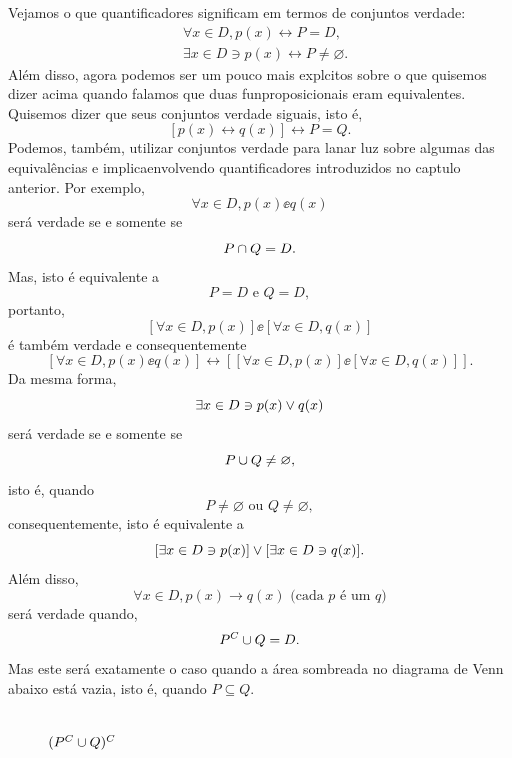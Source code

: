 Vejamos o que quantificadores significam em termos de conjuntos verdade:
\begin{equation*}
 \begin{aligned}
& \forall x \in D, p(x)\leftrightarrow P=D,\\
& \exists x \in D \ni p(x)\leftrightarrow P\neq\varnothing.
 \end{aligned}
\end{equation*}
Al\'em disso, agora podemos ser um pouco mais expl\ih citos sobre o que quisemos dizer acima quando falamos que duas fun\coes proposicionais eram equivalentes. Quisemos dizer que seus conjuntos verdade s\ao iguais, isto \'e,
\[
[p(x)\leftrightarrow q(x)]\leftrightarrow P=Q.
\]
Podemos, tamb\'em, utilizar conjuntos verdade para lan\cc ar luz sobre algumas das equival\^encias e implica\coes envolvendo quantificadores introduzidos no cap\ih tulo anterior. Por exemplo,
\[
\forall x\in D, p(x)\ee q(x)
\] 
ser\'a verdade se e somente se
\[
P\cap Q=D.
\]
Mas, isto \'e equivalente a
\[
P=D \textrm{ e } Q=D,
\]
portanto,
\[
[\forall x \in D, p(x)]\ee[\forall x \in D, q(x)]
\]
\'e tamb\'em verdade e consequentemente
\[
[\forall x\in D, p(x)\ee q(x)]\leftrightarrow[[\forall x \in D, p(x)]\ee[\forall x \in D, q(x)]].
\]
Da mesma forma,
\[
\exists x\in D\ni p(x)\vee q(x)
\]
ser\'a verdade se e somente se
\[
P\cup Q\neq\varnothing,
\]
isto \'e, quando
\[
P\neq\varnothing \textrm{ ou } Q\neq\varnothing,
\]
consequentemente, isto \'e equivalente a 
\[
[\exists x\in D\ni p(x)]\vee[\exists x\in D\ni q(x)].
\]
Al\'em disso,
\[
\forall x\in D, p(x)\to q(x) \textrm{ (cada $p$ \'e um $q$)}
\]
ser\'a verdade quando,
\[
P^C\cup Q=D.
\]
Mas este ser\'a exatamente o caso quando a \'area sombreada no diagrama de Venn abaixo est\'a vazia, isto \'e, quando $P\subseteq Q.$ 

\def\rectangle{(-3,-2) rectangle (5,2)}
\def\firstcircle{(0,0) circle (1.5cm)}
\def\secondcircle{(60:2cm) circle (1.5cm)}
\def\thirdcircle{(0:2cm) circle (1.5cm)}
\begin{figure}[h]
\centering
{}
\\
$(P^C\cup Q)^C$
\end{figure}

